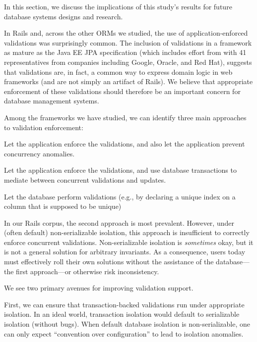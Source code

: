 In this section, we discuss the implications of this study's results
for future database systems designs and research.

In Rails and, across the other ORMs we studied, the use of
application-enforced validations was surprisingly common. The
inclusion of validations in a framework as mature as the Java EE JPA
specification (which includes effort from with 41 representatives from
companies including Google, Oracle, and Red Hat), suggests that
validations are, in fact, a common way to express domain logic in web
frameworks (and are not simply an artifact of Rails). We believe that
appropriate enforcement of these validations should therefore be an
important concern for database management systems.

 Among the frameworks we have studied,
we can identify three main approaches to validation enforcement:
\begin{defendenumerate}
\item Let the application enforce the validations, and also let
  the application prevent concurrency anomalies.

\item Let the application enforce the validations, and use database
  transactions to mediate between concurrent validations and updates.

\item Let the database perform validations (e.g., by declaring a unique
  index on a column that is supposed to be unique)
\end{defendenumerate}
In our Rails corpus, the second approach is most prevalent. However,
under (often default) non-serializable isolation, this approach is
insufficient to correctly enforce concurrent
validations. Non-serializable isolation is \textit{sometimes} okay,
but it is not a general solution for arbitrary invariants. As a
consequence, users today must effectively roll their own solutions
without the assistance of the database---the first approach---or
otherwise risk inconsistency.

We see two primary avenues for improving validation support.

 First, we can ensure that
transaction-backed validations run under appropriate isolation. In an
ideal world, transaction isolation would default to serializable
isolation (without bugs). When default database isolation is
non-serializable, one can only expect ``convention over
configuration'' to lead to isolation anomalies.

